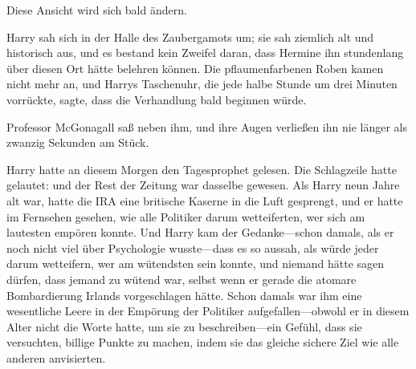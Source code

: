 Diese Ansicht wird sich bald ändern.

\later

Harry sah sich in der Halle des Zaubergamots um; sie sah ziemlich alt und historisch aus, und es bestand kein Zweifel daran, dass Hermine ihn stundenlang über diesen Ort hätte belehren können. Die pflaumenfarbenen Roben kamen nicht mehr an, und Harrys Taschenuhr, die jede halbe Stunde um drei Minuten vorrückte, sagte, dass die Verhandlung bald beginnen würde.

Professor McGonagall saß neben ihm, und ihre Augen verließen ihn nie länger als zwanzig Sekunden am Stück.

Harry hatte an diesem Morgen den Tagesprophet gelesen. Die Schlagzeile hatte gelautet:
und der Rest der Zeitung war dasselbe gewesen. Als Harry neun Jahre alt war, hatte die IRA eine britische Kaserne in die Luft gesprengt, und er hatte im Fernsehen gesehen, wie alle Politiker darum wetteiferten, wer sich am lautesten empören konnte. Und Harry kam der Gedanke—schon damals, als er noch nicht viel über Psychologie wusste—dass es so aussah, als würde jeder darum wetteifern, wer am wütendsten sein konnte, und niemand hätte sagen dürfen, dass jemand zu wütend war, selbst wenn er gerade die atomare Bombardierung Irlands vorgeschlagen hätte. Schon damals war ihm eine wesentliche Leere in der Empörung der Politiker aufgefallen—obwohl er in diesem Alter nicht die Worte hatte, um sie zu beschreiben—ein Gefühl, dass sie versuchten, billige Punkte zu machen, indem sie das gleiche sichere Ziel wie alle anderen anvisierten.

